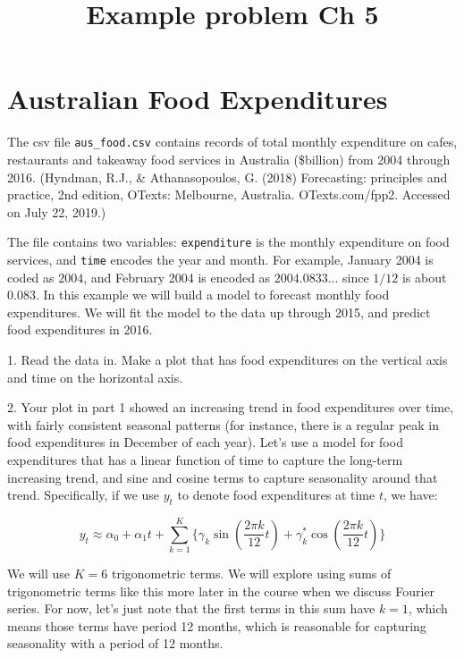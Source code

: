\documentclass[]{article}
\title{Example problem Ch 5}
\author{}
\begin{document}
\maketitle

\begin{abstract}

\end{abstract}

\section{Australian Food Expenditures}

The csv file \verb`aus_food.csv` contains records of total monthly expenditure on
cafes, restaurants and takeaway food services in Australia (\$billion) from
2004 through 2016. (Hyndman, R.J., \& Athanasopoulos, G. (2018)
Forecasting: principles and practice, 2nd edition,
OTexts: Melbourne, Australia. OTexts.com/fpp2. Accessed on July 22, 2019.)

The file contains two variables: \verb`expenditure` is the monthly expenditure
on food services, and \verb`time` encodes the year and month. For example,
January 2004 is coded as $2004$, and February 2004 is encoded as $2004.0833$...
since $1/12$ is about $0.083$.
In this example we will build a model to forecast monthly food expenditures.
We will fit the model to the data up through 2015, and predict food expenditures
in 2016.

1. Read the data in.  Make a plot that has food expenditures on the vertical
axis and time on the horizontal axis.


2. Your plot in part 1 showed an increasing trend in food expenditures over
time, with fairly consistent seasonal patterns (for instance, there is a
regular peak in food expenditures in December of each year).  Let's use a
model for food expenditures that has a linear function of time to capture
the long-term increasing trend, and sine and cosine terms to capture
seasonality around that trend. Specifically, if we use $y_t$ to denote food
expenditures at time $t$, we have:

\begin{equation*}
y_t \approx \alpha_0 + \alpha_1 t + \sum_{k = 1}^K \{\gamma_{k} \sin\left( \frac{2 \pi k}{12} t \right) + \gamma^*_{k} \cos\left( \frac{2 \pi k}{12} t \right) \}
\end{equation*}

We will use $K = 6$ trigonometric terms.  We will explore
using sums of trigonometric terms like this more later in the course when we discuss
Fourier series.  For now, let's just note that the first terms in this sum have $k = 1$,
which means those terms have period 12 months, which is reasonable for capturing
seasonality with a period of 12 months.
\end{document}
